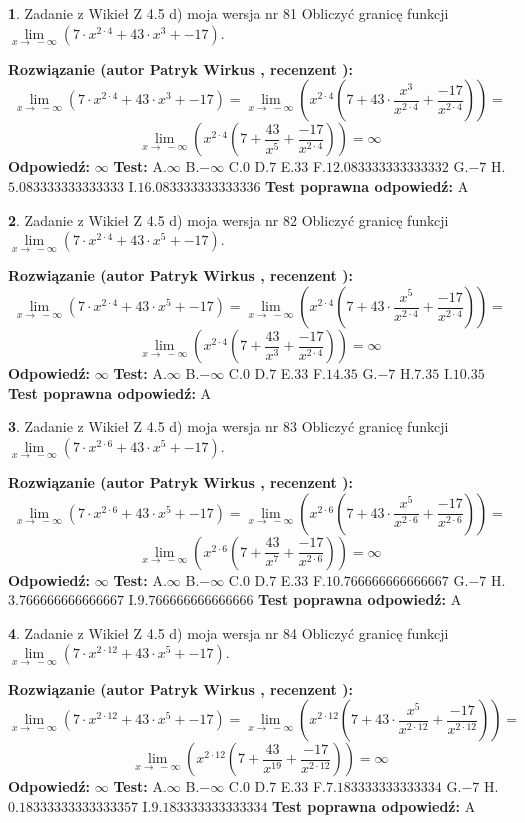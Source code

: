 \documentclass[12pt, a4paper]{article}
\theoremstyle{definition} %
\newtheorem{zad}{}
\newcommand{\zadStart}[1]{\begin{zad}#1\newline}
\newcommand{\zadStop}{\end{zad}}
\newcommand{\rozwStart}[2]{\noindent \textbf{Rozwiązanie (autor #1 , recenzent #2): }\newline}
\newcommand{\rozwStop}{\newline}
\newcommand{\odpStart}{\noindent \textbf{Odpowiedź:}\newline}
\newcommand{\odpStop}{\newline}
\newcommand{\testStart}{\noindent \textbf{Test:}\newline}
\newcommand{\testStop}{\newline}
\newcommand{\kluczStart}{\noindent \textbf{Test poprawna odpowiedź:}\newline}
\newcommand{\kluczStop}{\newline}
\begin{document}
\zadStart{Zadanie z Wikieł Z 4.5 d) moja wersja nr 81}
Obliczyć granicę funkcji  $\lim\limits_{x\to\ -\infty}(7 \cdot x^{2\cdot4}+43 \cdot x^{3}+-17)$.
\zadStop
\rozwStart{Patryk Wirkus}{}
$$\lim\limits_{x\to\ -\infty}(7 \cdot x^{2\cdot4}+43 \cdot x^{3}+-17) = \lim\limits_{x\to\ -\infty}(x^{2\cdot4}(7 +43 \cdot \frac{x^{3}}{x^{2\cdot4}}+\frac{-17}{x^{2\cdot4}})) =$$ $$\lim\limits_{x\to\ -\infty}(x^{2\cdot4}(7 +\frac{43}{x^{5}}+\frac{-17}{x^{2\cdot4}})) =\infty$$
\rozwStop
\odpStart
$\infty$
\odpStop
\testStart
A.$\infty$ B.$-\infty$ C.$0$ D.$7$ E.$33$
F.$12.083333333333332$ G.$-7$
H.$5.083333333333333$
I.$16.083333333333336$
\testStop
\kluczStart
A
\kluczStop



\zadStart{Zadanie z Wikieł Z 4.5 d) moja wersja nr 82}
Obliczyć granicę funkcji  $\lim\limits_{x\to\ -\infty}(7 \cdot x^{2\cdot4}+43 \cdot x^{5}+-17)$.
\zadStop
\rozwStart{Patryk Wirkus}{}
$$\lim\limits_{x\to\ -\infty}(7 \cdot x^{2\cdot4}+43 \cdot x^{5}+-17) = \lim\limits_{x\to\ -\infty}(x^{2\cdot4}(7 +43 \cdot \frac{x^{5}}{x^{2\cdot4}}+\frac{-17}{x^{2\cdot4}})) =$$ $$\lim\limits_{x\to\ -\infty}(x^{2\cdot4}(7 +\frac{43}{x^{3}}+\frac{-17}{x^{2\cdot4}})) =\infty$$
\rozwStop
\odpStart
$\infty$
\odpStop
\testStart
A.$\infty$ B.$-\infty$ C.$0$ D.$7$ E.$33$
F.$14.35$ G.$-7$
H.$7.35$
I.$10.35$
\testStop
\kluczStart
A
\kluczStop



\zadStart{Zadanie z Wikieł Z 4.5 d) moja wersja nr 83}
Obliczyć granicę funkcji  $\lim\limits_{x\to\ -\infty}(7 \cdot x^{2\cdot6}+43 \cdot x^{5}+-17)$.
\zadStop
\rozwStart{Patryk Wirkus}{}
$$\lim\limits_{x\to\ -\infty}(7 \cdot x^{2\cdot6}+43 \cdot x^{5}+-17) = \lim\limits_{x\to\ -\infty}(x^{2\cdot6}(7 +43 \cdot \frac{x^{5}}{x^{2\cdot6}}+\frac{-17}{x^{2\cdot6}})) =$$ $$\lim\limits_{x\to\ -\infty}(x^{2\cdot6}(7 +\frac{43}{x^{7}}+\frac{-17}{x^{2\cdot6}})) =\infty$$
\rozwStop
\odpStart
$\infty$
\odpStop
\testStart
A.$\infty$ B.$-\infty$ C.$0$ D.$7$ E.$33$
F.$10.766666666666667$ G.$-7$
H.$3.766666666666667$
I.$9.766666666666666$
\testStop
\kluczStart
A
\kluczStop



\zadStart{Zadanie z Wikieł Z 4.5 d) moja wersja nr 84}
Obliczyć granicę funkcji  $\lim\limits_{x\to\ -\infty}(7 \cdot x^{2\cdot12}+43 \cdot x^{5}+-17)$.
\zadStop
\rozwStart{Patryk Wirkus}{}
$$\lim\limits_{x\to\ -\infty}(7 \cdot x^{2\cdot12}+43 \cdot x^{5}+-17) = \lim\limits_{x\to\ -\infty}(x^{2\cdot12}(7 +43 \cdot \frac{x^{5}}{x^{2\cdot12}}+\frac{-17}{x^{2\cdot12}})) =$$ $$\lim\limits_{x\to\ -\infty}(x^{2\cdot12}(7 +\frac{43}{x^{19}}+\frac{-17}{x^{2\cdot12}})) =\infty$$
\rozwStop
\odpStart
$\infty$
\odpStop
\testStart
A.$\infty$ B.$-\infty$ C.$0$ D.$7$ E.$33$
F.$7.183333333333334$ G.$-7$
H.$0.18333333333333357$
I.$9.183333333333334$
\testStop
\kluczStart
A
\kluczStop
\end{document}
